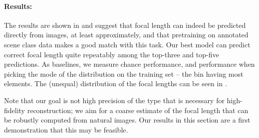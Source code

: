 \paragraph{Results:} The results are shown in  and suggest that focal length can indeed be predicted directly from images, at least approximately, and that pretraining on annotated scene class data makes a good match with this task. Our best model can predict correct focal length quite repeatably  among the top-three and top-five predictions. As baselines, we measure chance performance, and performance when picking the mode of the distribution on the training set -- the bin having most elements. The (unequal) distribution of the focal lengths can be seen in .


Note that our goal is not high precision of the type that is necessary for high-fidelity reconstruction; we aim for a coarse estimate of the focal length that can be robustly computed from natural images. Our results in this section are a first demonstration that this may be feasible.

\begin{table}
\centering
{}
    \caption{Focal length misclassification rate (top-1, top-3 and top-5 predictions) of networks pretrained on object images from Imagenet and the Places dataset. Lower is better.}
\end{table}